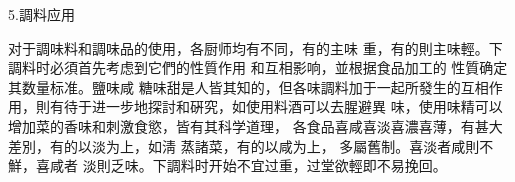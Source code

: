 5.調料应用

对于調味料和調味品的使用，各厨师均有不同，有的主味 重，有的則主味輕。下調料时必須首先考虑到它們的性質作用 和互相影响，並根据食品加工的
性質确定其数量标准。鹽味咸 糖味甜是人皆其知的，但各味調料加于一起所發生的互相作 用，則有待于进一步地探討和硏究，如使用料酒可以去腥避異 味，使用味精可以增加菜的香味和刺激食慾，皆有其科学道理， 各食品喜咸喜淡喜濃喜薄，有甚大差別，有的以淡为上，如淸 蒸諸菜，有的以咸为上，
多屬舊制。喜淡者咸則不鮮，喜咸者 淡則乏味。下調料时开始不宜过重，过堂欲輕即不易挽回。
